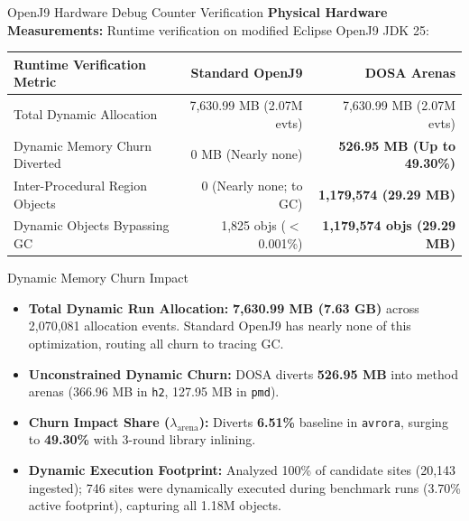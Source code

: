 \documentclass[11pt]{beamer}
\begin{document}
\begingroup
{}
\begin{frame}{OpenJ9 Hardware Debug Counter Verification}
  \vspace{-0.5em}
  {\scriptsize\textbf{Physical Hardware Measurements:} Runtime verification on modified Eclipse OpenJ9 JDK 25:}\par\vspace{2pt}

  \begin{table}[h]
    \centering
    \scriptsize
    \setlength{\tabcolsep}{3.5pt}
    \renewcommand{\arraystretch}{1.18}
    \begin{tabular}{@{}lrr@{}}
      \toprule
      \textbf{Runtime Verification Metric} & \textbf{Standard OpenJ9} & \textbf{DOSA Arenas} \\
      \midrule
      Total Dynamic Allocation & 7,630.99 MB (2.07M evts) & 7,630.99 MB (2.07M evts) \\
      Dynamic Memory Churn Diverted & 0 MB (Nearly none) & \textbf{526.95 MB (Up to 49.30\%)} \\
      Inter-Procedural Region Objects & 0 (Nearly none; to GC) & \textbf{1,179,574 (29.29 MB)} \\
      Dynamic Objects Bypassing GC & 1,825 objs ($<$0.001\%) & \textbf{1,179,574 objs (29.29 MB)} \\
      \bottomrule
    \end{tabular}
  \end{table}

  \vspace{-0.3em}
  \begin{block}{Dynamic Memory Churn Impact}
    \scriptsize
    \begin{itemize}\setlength{\itemsep}{1.5pt}\setlength{\topsep}{0pt}\setlength{\parskip}{0pt}\setlength{\parsep}{0pt}
      \item \textbf{Total Dynamic Run Allocation:} \textbf{7,630.99 MB (7.63 GB)} across 2,070,081 allocation events. Standard OpenJ9 has nearly none of this optimization, routing all churn to tracing GC.
      \item \textbf{Unconstrained Dynamic Churn:} DOSA diverts \textbf{526.95 MB} into method arenas (366.96 MB in \texttt{h2}, 127.95 MB in \texttt{pmd}).
      \item \textbf{Churn Impact Share ($\lambda_{\text{arena}}$):} Diverts \textbf{6.51\%} baseline in \texttt{avrora}, surging to \textbf{49.30\%} with 3-round library inlining.
      \item \textbf{Dynamic Execution Footprint:} Analyzed 100\% of candidate sites (20,143 ingested); 746 sites were dynamically executed during benchmark runs (3.70\% active footprint), capturing all 1.18M objects.
    \end{itemize}
  \end{block}
\end{frame}
\endgroup
\end{document}
